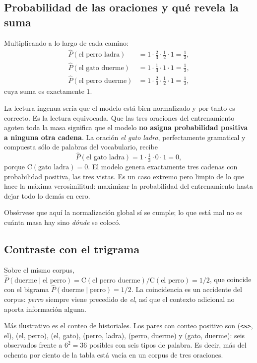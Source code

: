 \documentclass[11pt,letterpaper]{article}
\newcommand{\Count}{\mathrm{C}}
\newcommand{\bos}{\texttt{<s>}}
\begin{document}
\subsection{Probabilidad de las oraciones y qué revela la suma}

Multiplicando a lo largo de cada camino:
\begin{align*}
\hat P(\text{el perro ladra})  &= 1\cdot\tfrac{2}{3}\cdot\tfrac{1}{2}\cdot 1 =
\tfrac13,\\
\hat P(\text{el gato duerme})  &= 1\cdot\tfrac{1}{3}\cdot 1\cdot 1 = \tfrac13,\\
\hat P(\text{el perro duerme}) &= 1\cdot\tfrac{2}{3}\cdot\tfrac{1}{2}\cdot 1 =
\tfrac13,
\end{align*}
cuya suma es exactamente $1$.

La lectura ingenua sería que el modelo está bien normalizado y por tanto es
correcto. Es la lectura equivocada. Que las tres oraciones del entrenamiento
agoten toda la masa significa que el modelo \textbf{no asigna probabilidad
positiva a ninguna otra cadena}. La oración \emph{el gato ladra}, perfectamente
gramatical y compuesta sólo de palabras del vocabulario, recibe
\[
\hat P(\text{el gato ladra}) = 1\cdot\tfrac{1}{3}\cdot 0\cdot 1 = 0,
\]
porque $\Count(\text{gato ladra})=0$. El modelo genera exactamente tres cadenas
con probabilidad positiva, las tres vistas. Es un caso extremo pero limpio de lo
que hace la máxima verosimilitud: maximizar la probabilidad del entrenamiento
hasta dejar todo lo demás en cero.

Obsérvese que aquí la normalización global sí se cumple; lo que está mal no es
cuánta masa hay sino \emph{dónde} se colocó.

\subsection{Contraste con el trigrama}

Sobre el mismo corpus, $\hat P(\text{duerme}\mid\text{el perro}) =
\Count(\text{el perro duerme})/\Count(\text{el perro}) = 1/2$, que coincide con
el bigrama $\hat P(\text{duerme}\mid\text{perro})=1/2$. La coincidencia es un
accidente del corpus: \emph{perro} siempre viene precedido de \emph{el}, así que
el contexto adicional no aporta información alguna.

Más ilustrativo es el conteo de historiales. Los pares con conteo positivo son
(\bos, el), (el, perro), (el, gato), (perro, ladra), (perro, duerme) y (gato,
duerme): seis observados frente a $6^2=36$ posibles con seis tipos de palabra.
Es decir, más del ochenta por ciento de la tabla está vacía en un corpus de tres
oraciones.
\end{document}
